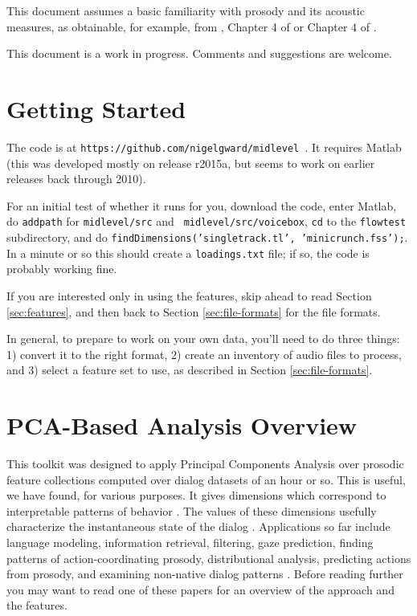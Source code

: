 \documentclass[11pt]{article}
\begin{document}
This document assumes a basic familiarity with prosody and its
acoustic measures, as obtainable, for example, from \cite{me-cup},
Chapter 4 of \cite{ogden-phonetics} or Chapter 4 of
\cite{ladefoged03}.

This document is a work in progress.  Comments and suggestions are
welcome.


\section{Getting Started}

The code is at {\tt https://github.com/nigelgward/midlevel }.  It requires
 Matlab (this was developed mostly on release r2015a, but seems to
 work on earlier releases back through 2010).


For an initial test of whether it runs for you, download the code,
enter Matlab, do {\tt addpath} for {\tt midlevel/src} and {\tt
  midlevel/src/voicebox}, {\tt cd} to the {\tt flowtest} subdirectory,
and do {\tt findDimensions('singletrack.tl', 'minicrunch.fss');}. In a
minute or so this should create a {\tt loadings.txt} file; if so, the
code is probably working fine.

If you are interested only in using the features, skip ahead to read
Section \ref{sec:features}, and then back to Section
\ref{sec:file-formats} for the file formats.

In general, to prepare to work on your own data, you'll need to do
three things: 1) convert it to the right format, 2) create an
inventory of audio files to process, and 3) select a feature set to
use, as described in Section \ref{sec:file-formats}.


\section{PCA-Based Analysis Overview }

This toolkit was designed to apply Principal Components Analysis over
prosodic feature collections computed over dialog datasets of an hour
or so.  This is useful, we have found, for various purposes.  It gives
dimensions which correspond to interpretable patterns of behavior
\cite{prosodic-elements}.  The values of these dimensions usefully
characterize the instantaneous state of the dialog
\cite{dialog-dimensions}.  Applications so far include language
modeling, information retrieval, filtering, gaze prediction, finding
patterns of action-coordinating prosody, distributional analysis,
predicting actions from prosody, and examining non-native dialog
patterns
\cite{pca-lm,prosody-ir,sigdial-codec,ward-gaze,ward-abu,dimensions-uh-huh,l2english,me-mandarin,ward-stance}.
Before reading further you may want to read one of these papers for an
overview of the approach and the features.
\end{document}
